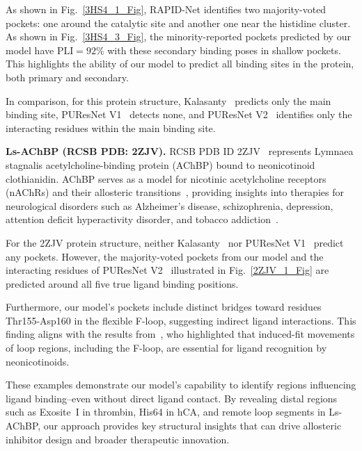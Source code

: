 \documentclass[10pt,conference]{IEEEtran}
\begin{document}
As shown in Fig.~\ref{3HS4_1_Fig}, RAPID-Net identifies two majority-voted pockets: one around the catalytic site and another one near the histidine cluster. As shown in Fig.~\ref{3HS4_3_Fig}, the minority-reported pockets predicted by our model have $\text{PLI} = 92\%$ with these secondary binding poses in shallow pockets. This highlights the ability of our model to predict all binding sites in the protein, both primary and secondary. 


In comparison, for this protein structure, Kalasanty~\cite{stepniewska2020improving} predicts only the main binding site, PUResNet V1~\cite{kandel2021puresnet} detects none, and PUResNet V2~\cite{jeevan2024puresnetv2} identifies only the interacting residues within the main binding site.




\vspace{1em}
\noindent
\textbf{Ls-AChBP (RCSB PDB: 2ZJV).} RCSB PDB ID 2ZJV~\cite{ihara2008lymnaea} represents Lymnaea stagnalis acetylcholine-binding protein (AChBP) bound to neonicotinoid clothianidin. AChBP serves as a model for nicotinic acetylcholine receptors (nAChRs) and their allosteric transitions~\cite{taly2009nicotinic}, providing insights into therapies for neurological disorders such as Alzheimer’s disease, schizophrenia, depression, attention deficit hyperactivity disorder, and tobacco addiction~\cite{arneric2007neuronal,levin2007nicotinic,romanelli2007central}. 

For the 2ZJV protein structure, neither Kalasanty~\cite{stepniewska2020improving} nor PUResNet V1~\cite{kandel2021puresnet} predict any pockets. However, the majority-voted pockets from our model and the interacting residues of PUResNet V2~\cite{jeevan2024puresnetv2} illustrated in Fig.~\ref{2ZJV_1_Fig} are predicted around all five true ligand binding positions. 


Furthermore, our model's pockets include distinct bridges toward residues Thr155-Asp160 in the flexible F-loop, suggesting indirect ligand interactions. This finding aligns with the results from~\cite{ihara2008lymnaea}, who highlighted that induced-fit movements of loop regions, including the F-loop, are essential for ligand recognition by neonicotinoids.

These examples demonstrate our model's capability to identify regions influencing ligand binding--even without direct ligand contact. By revealing distal regions such as Exosite~\rm{I} in thrombin, His64 in hCA, and remote loop segments in Ls-AChBP, our approach provides key structural insights that can drive allosteric inhibitor design and broader therapeutic innovation.
\end{document}

